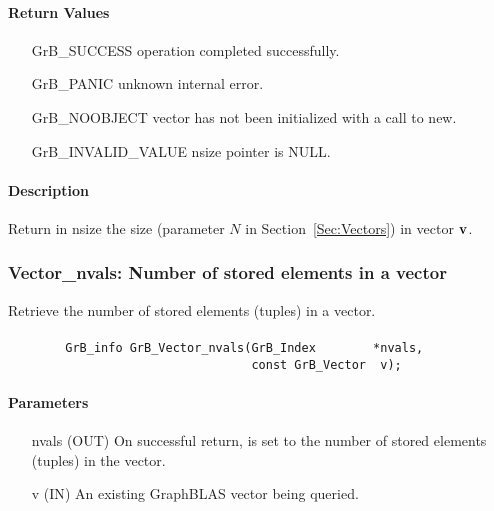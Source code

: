\paragraph{Return Values}

\begin{itemize}[leftmargin=2.1in]
\item[{\sf GrB\_SUCCESS}]   operation completed successfully.
\item[{\sf GrB\_PANIC}]     unknown internal error.
\item[{\sf GrB\_NOOBJECT}]  vector has not been initialized with a call to {\sf new}.
\item[{\sf GrB\_INVALID\_VALUE}]    {\sf nsize} pointer is {\sf NULL}.
\end{itemize}

\paragraph{Description}

Return in {\sf nsize} the size (parameter $N$ in Section~\ref{Sec:Vectors}) in vector ${\bf v}$.

\subsubsection{{\sf Vector\_nvals}: Number of stored elements in a vector}

Retrieve the number of stored elements (tuples) in a vector.

\paragraph{\syntax}

\begin{verbatim}
        GrB_info GrB_Vector_nvals(GrB_Index        *nvals,
                                  const GrB_Vector  v);
\end{verbatim}

\paragraph{Parameters}

\begin{itemize}[leftmargin=1.1in]
    \item[{\sf nvals}] ({\sf OUT}) On successful return, is set to the number of 
                                   stored elements (tuples) in the vector.
    \item[{\sf v}]     ({\sf IN})  An existing GraphBLAS vector being queried.
\end{itemize}


